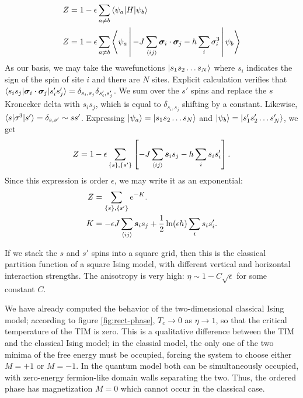 \documentclass[
  amsmath,
  amssymb,
  aps,
  twocolumn,
  nofootinbib,
  nolongbibliography,
  floatfix,
]{revtex4-2}
\newcommand{\brackets}[1]{\left [ #1 \right ]}
\begin{document}
\begin{equation}
  \begin{split}
    Z &= 1 - \epsilon\sum_{a\neq b}\braket{\psi_a|H|\psi_b}\\
    Z &= 1 - \epsilon\sum_{a\neq b}\Braket{\psi_a|-J\sum_{\braket{ij}}\bm \sigma_i \cdot \bm \sigma_j - h\sum_i\sigma_i^3|\psi_b}
  \end{split}
\end{equation}
As our basis, we may take the wavefunctions $\ket{s_1 s_2 \dots s_N}$ where $s_i$ indicates the sign of the spin of site $i$ and there are $N$ sites. Explicit calculation verifies that $\braket{s_is_j|\bm \sigma_i \cdot \bm \sigma_j|s_i's_j'}=\delta_{s_i,s_j}\delta_{s'_i,s'_j}$. We sum over the $s'$ spins and replace the $s$ Kronecker delta with $s_i s_j$, which is equal to $\delta_{s_i,s_j}$ shifting by a constant. Likewise, $\braket{s|\sigma^3|s'}=\delta_{s,s'}\sim ss'$. Expressing $\ket{\psi_a}=\ket{s_1 s_2 \dots s_N}$ and $\ket{\psi_b}=\ket{s'_1 s'_2 \dots s'_N}$, we get
\begin{equation}
  Z = 1 - \epsilon\sum_{\{s\},\{s'\}} \brackets{-J\sum_{\braket{ij}}\bm s_is_j - h\sum_is_i s'_i}.
\end{equation}
Since this expression is order $\epsilon$, we may write it as an exponential:
\begin{equation}
  \begin{split}
    Z &= \sum_{\{s\},\{s'\}} e^{-K}.\\
    K &= -\epsilon J\sum_{\braket{ij}}\bm s_is_j +\frac{1}{2}\ln(\epsilon h)\sum_is_i s'_i.
  \end{split}
\end{equation}

If we stack the $s$ and $s'$ spins into a square grid, then this is the classical partition function of a square Ising model, with different vertical and horizontal interaction strengths. The anisotropy is very high: $\eta \sim 1 - C\sqrt{\epsilon}$ for some constant $C$.

We have already computed the behavior of the two-dimensional classical Ising model; according to figure \ref{fig:rect-phase}, $T_c\rightarrow 0$ as $\eta \rightarrow 1$, so that the critical temperature of the TIM is zero. This is a qualitative difference between the TIM and the classical Ising model; in the classial model, the only one of the two minima of the free energy must be occupied, forcing the system to choose either $M=+1$ or $M=-1$. In the quantum model both can be simultaneously occupied, with zero-energy fermion-like domain walls separating the two. Thus, the ordered phase has magnetization $M=0$ which cannot occur in the classical case.
\end{document}
